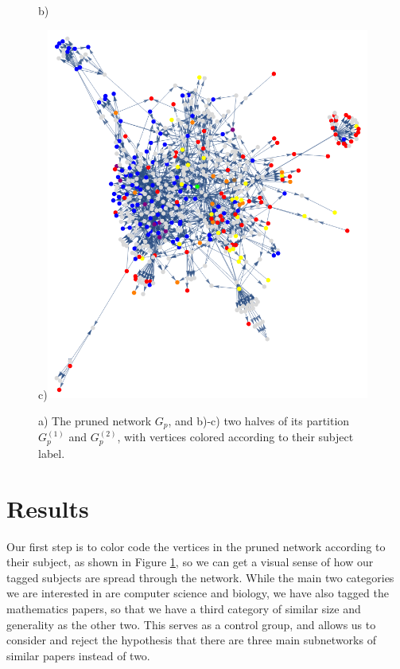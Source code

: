 \documentclass[12pt]{thesis}
\theoremstyle{plain}
\theoremstyle{definition}
\theoremstyle{remark}
\begin{document}
\begin{figure}[p]
\begin{minipage}[c]{0.49\textwidth}
b)
\vspace{-16pt}
\end{minipage}
\hfill
\begin{minipage}[c]{0.49\textwidth}
c)\includegraphics[width=0.95\textwidth]{color_coded_right.png}
\end{minipage}
\caption{a) The pruned network $G_p$, and b)-c) two halves of its partition $G_p^{(1)}$ and $G_p^{(2)}$, with vertices colored according to their subject label.}
\label{fig:subject_color_coded}
\end{figure}

\section{Results}

Our first step is to color code the vertices in the pruned network according to their subject, as shown in Figure \ref{fig:subject_color_coded}, so we can get a visual sense of how our tagged subjects are spread through the network. While the main two categories we are interested in are computer science and biology, we have also tagged the mathematics papers, so that we have a third category of similar size and generality as the other two. This serves as a control group, and allows us to consider and reject the hypothesis that there are three main subnetworks of similar papers instead of two. 
\end{document}
